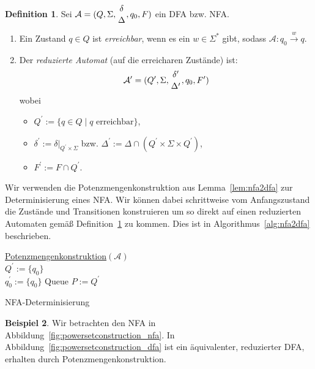 \documentclass[11pt, a4paper]{article}
\theoremstyle{definition}
\newtheorem{definition}{Definition}[section]
\newtheorem{example}[definition]{Beispiel}
\theoremstyle{plain}
\numberwithin{equation}{section}
\newcommand{\reaches}[1]{\overset{#1}{\rightarrow}}
\begin{document}
\begin{definition}\label{def:reduced_automaton}
	Sei \( \mathcal{A} = (Q, \Sigma, \genfrac{}{}{-10pt}{0}{\delta}{\Delta}, q_0, F) \) ein DFA bzw. NFA.
	\begin{enumerate}
		\item Ein Zustand \( q \in Q \) ist \textit{erreichbar}, wenn es ein \( w \in \Sigma^\ast \) gibt, sodass \( \mathcal{A}: q_0 \reaches{w} q \).
		\item Der \textit{reduzierte Automat} (auf die erreicharen Zustände) ist:
			\[
				\mathcal{A}^\prime = (Q^\prime, \Sigma, \genfrac{}{}{-10pt}{0}{\delta^\prime}{\Delta^\prime}, q_0, F^\prime)
			\]
			wobei
			\begin{itemize}
				\item \( Q^\prime := \{ q \in Q \mid q \text{ erreichbar} \} \),
				\item \( \delta^\prime := \left. \delta \right|_{Q^\prime \times \Sigma} \) bzw. \( \Delta^\prime := \Delta \cap (Q^\prime \times \Sigma \times Q^\prime) \),
				\item \( F^\prime := F \cap Q^\prime\).
			\end{itemize}
	\end{enumerate}
\end{definition}
Wir verwenden die Potenzmengenkonstruktion aus Lemma~\ref{lem:nfa2dfa} zur Determinisierung eines NFA. Wir können dabei schrittweise vom Anfangszustand die Zustände und Transitionen konstruieren um so direkt auf einen reduzierten Automaten gemäß Definition~\ref{def:reduced_automaton} zu kommen. Dies ist in Algorithmus~\ref{alg:nfa2dfa} beschrieben.
\begin{algorithm}
	\underline{Potenzmengenkonstruktion}{$(\mathcal{A})$}\\
	$Q^\prime := \{q_0\}$\\
	$q_0^\prime := \{q_0\}$
	Queue $P := Q^\prime$\\
	\caption{NFA-Determinisierung}
	\label{alg:nfa2dfa}
\end{algorithm}
\begin{example}
	Wir betrachten den NFA in Abbildung~\ref{fig:powersetconstruction_nfa}. In Abbildung~\ref{fig:powersetconstruction_dfa} ist ein äquivalenter, reduzierter DFA, erhalten durch Potenzmengenkonstruktion.
\end{example}
\end{document}
